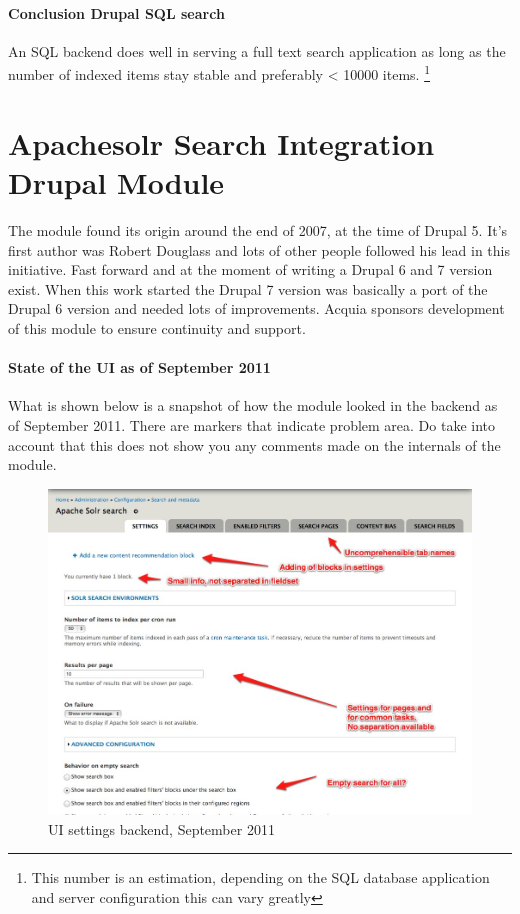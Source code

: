 \paragraph{Conclusion Drupal SQL search} An SQL backend does well in serving a full text search application as long as the number of indexed items stay stable and preferably < 10000 items. \footnote{This number is an estimation, depending on the SQL database application and server configuration this can vary greatly}

\section{Apachesolr Search Integration Drupal Module}
The module found its origin around the end of 2007, at the time of Drupal 5. It's first author was Robert Douglass and lots of other people followed his lead in this initiative. Fast forward and at the moment of writing a Drupal 6 and 7 version exist. When this work started the Drupal 7 version was basically a port of the Drupal 6 version and needed lots of improvements. Acquia sponsors development of this module to ensure continuity and support.

\paragraph{State of the UI as of September 2011} What is shown below is a snapshot of how the module looked in the backend as of September 2011. There are markers that indicate problem area. Do take into account that this does not show you any comments made on the internals of the module.
\begin{figure}[H]
     \includegraphics[width=\textwidth]{images/apachesolr_ui_backend_september_2011_1.jpg}
     \caption{UI settings backend, September 2011}
\end{figure}

